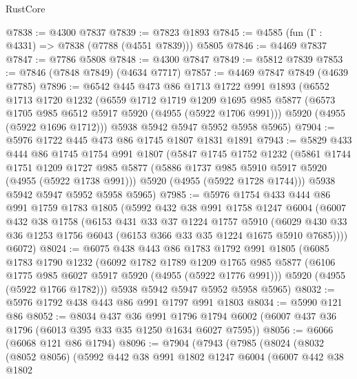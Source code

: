 \begin{lexlean}{RustCore}
\begin{coremodule}
@7838 := @4300 @7837
@7839 := @7823 @1893
@7845 := @4585 (fun (Γ : @4331) => @7838 (@7788 (@4551 @7839))) @5805
@7846 := @4469 @7837
@7847 := @7786 @5808
@7848 := @4300 @7847
@7849 := @5812 @7839
@7853 := @7846 (@7848 @7849) (@4634 @7717)
@7857 := @4469 @7847 @7849 (@4639 @7785)
@7896 := @6542
    @445
    @473
    @86
    @1713
    @1722
    @991
    @1893
    (@6552
      @1713
      @1720
      @1232
      (@6559
        @1712
        @1719
        @1209
        @1695
        @985
        @5877
        (@6573 @1705 @985 @6512 @5917 @5920 (@4955 (@5922 @1706 @991)))
        @5920
        (@4955 (@5922 @1696 @1712)))
      @5938
      @5942
      @5947
      @5952
      @5958
      @5965)
@7904 := @5976 @1722 @445 @473 @86 @1745 @1807 @1831 @1891
@7943 := @5829
    @433
    @444
    @86
    @1745
    @1754
    @991
    @1807
    (@5847
      @1745
      @1752
      @1232
      (@5861
        @1744
        @1751
        @1209
        @1727
        @985
        @5877
        (@5886 @1737 @985 @5910 @5917 @5920 (@4955 (@5922 @1738 @991)))
        @5920
        (@4955 (@5922 @1728 @1744)))
      @5938
      @5942
      @5947
      @5952
      @5958
      @5965)
@7985 := @5976
    @1754
    @433
    @444
    @86
    @991
    @1759
    @1783
    @1805
    (@5992
      @432
      @38
      @991
      @1758
      @1247
      @6004
      (@6007
        @432
        @38
        @1758
        (@6153
          @431
          @33
          @37
          @1224
          @1757
          @5910
          (@6029 @430 @33 @36 @1253 @1756 @6043 (@6153 @366 @33 @35 @1224 @1675 @5910 @7685))))
      @6072)
@8024 := @6075
    @438
    @443
    @86
    @1783
    @1792
    @991
    @1805
    (@6085
      @1783
      @1790
      @1232
      (@6092
        @1782
        @1789
        @1209
        @1765
        @985
        @5877
        (@6106 @1775 @985 @6027 @5917 @5920 (@4955 (@5922 @1776 @991)))
        @5920
        (@4955 (@5922 @1766 @1782)))
      @5938
      @5942
      @5947
      @5952
      @5958
      @5965)
@8032 := @5976 @1792 @438 @443 @86 @991 @1797 @991 @1803
@8034 := @5990 @121 @86
@8052 := @8034
    @437
    @36
    @991
    @1796
    @1794
    @6002
    (@6007 @437 @36 @1796 (@6013 @395 @33 @35 @1250 @1634 @6027 @7595))
@8056 := @6066 (@6068 @121 @86 @1794)
@8096 := @7904
    (@7943
      (@7985
        (@8024
          (@8032
            (@8052 @8056)
            (@5992
              @442
              @38
              @991
              @1802
              @1247
              @6004
              (@6007
                @442
                @38
                @1802

\end{coremodule}
\end{lexlean}
